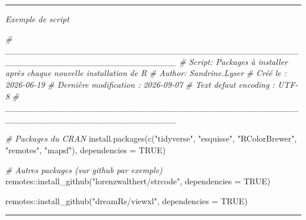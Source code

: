 \documentclass[
  french,
  10pt,
  a4paper,
]{article}
\newenvironment{Shaded}{}{}
\newcommand{\AttributeTok}[1]{\textcolor[rgb]{0.65,0.15,0.64}{#1}}
\newcommand{\CommentTok}[1]{\textcolor[rgb]{0.63,0.63,0.65}{\textit{#1}}}
\newcommand{\ConstantTok}[1]{\textcolor[rgb]{0.60,0.41,0.00}{#1}}
\newcommand{\FunctionTok}[1]{\textcolor[rgb]{0.25,0.47,0.95}{#1}}
\newcommand{\NormalTok}[1]{\textcolor[rgb]{0.22,0.23,0.26}{#1}}
\newcommand{\SpecialCharTok}[1]{\textcolor[rgb]{0.00,0.52,0.74}{#1}}
\newcommand{\StringTok}[1]{\textcolor[rgb]{0.31,0.63,0.31}{#1}}
\begin{document}
\begin{center}\rule{0.5\linewidth}{0.5pt}\end{center}

\emph{Exemple de script}

\begin{Shaded}
\begin{Highlighting}[]
\CommentTok{\#   \_\_\_\_\_\_\_\_\_\_\_\_\_\_\_\_\_\_\_\_\_\_\_\_\_\_\_\_\_\_\_\_\_\_\_\_\_\_\_\_\_\_\_\_\_\_\_\_\_\_\_\_\_\_\_\_\_\_\_\_\_\_\_\_\_\_\_\_\_\_\_\_\_\_\_\_}
\CommentTok{\#   Script: Packages à installer après chaque nouvelle installation de R}
\CommentTok{\#   Author: Sandrine.Lyser}
\CommentTok{\#   Créé le : 2026{-}06{-}19}
\CommentTok{\#   Dernière modification : 2026{-}09{-}07}
\CommentTok{\#   Text defaut encoding : UTF{-}8}
\CommentTok{\#   \_\_\_\_\_\_\_\_\_\_\_\_\_\_\_\_\_\_\_\_\_\_\_\_\_\_\_\_\_\_\_\_\_\_\_\_\_\_\_\_\_\_\_\_\_\_\_\_\_\_\_\_\_\_\_\_\_\_\_\_\_\_\_\_\_\_\_\_\_\_\_\_\_\_\_\_}


\CommentTok{\# Packages du CRAN}
\FunctionTok{install.packages}\NormalTok{(}\FunctionTok{c}\NormalTok{(}\StringTok{"tidyverse"}\NormalTok{, }\StringTok{"esquisse"}\NormalTok{, }\StringTok{"RColorBrewer"}\NormalTok{, }\StringTok{"remotes"}\NormalTok{, }\StringTok{"mapsf"}\NormalTok{),}
                 \AttributeTok{dependencies =} \ConstantTok{TRUE}\NormalTok{)}

\CommentTok{\# Autres packages (sur github par exemple)}
\NormalTok{remotes}\SpecialCharTok{::}\FunctionTok{install\_github}\NormalTok{(}\StringTok{"lorenzwalthert/strcode"}\NormalTok{, }\AttributeTok{dependencies =} \ConstantTok{TRUE}\NormalTok{)}
                        
\NormalTok{remotes}\SpecialCharTok{::}\FunctionTok{install\_github}\NormalTok{(}\StringTok{"dreamRs/viewxl"}\NormalTok{, }\AttributeTok{dependencies =} \ConstantTok{TRUE}\NormalTok{)}
\end{Highlighting}
\end{Shaded}

\begin{center}\rule{0.5\linewidth}{0.5pt}\end{center}
\end{document}
